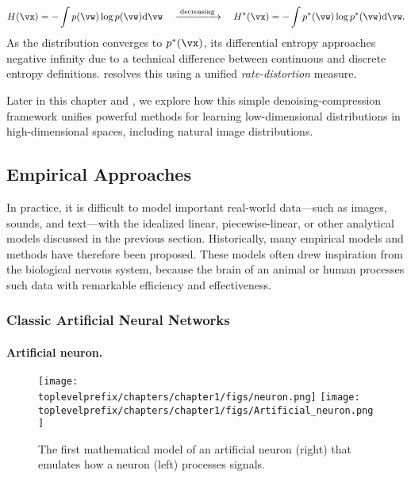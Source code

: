 \documentclass[../../book-main.tex]{subfiles}
\begin{document}
\begin{equation}
    H(\vx) = - \int p(\vw) \log p(\vw) \odif{\vw} \quad \xrightarrow{\hspace{1mm} \text{decreasing} \hspace{1mm}} \quad H^{*}(\vx) = - \int p^{*}(\vw) \log p^{*}(\vw) \odif{\vw}.
\end{equation}
As the distribution converges to \(p^{*}(\vx)\), its differential entropy approaches negative infinity due to a technical difference between continuous and discrete entropy definitions.  resolves this using a unified \textit{rate-distortion} measure.

Later in this chapter and , we explore how this simple denoising-compression framework unifies powerful methods for learning low-dimensional distributions in high-dimensional spaces, including natural image distributions.
\subsection{Empirical Approaches}
In practice, it is difficult to model important real-world data---such as images, sounds, and text---with the idealized linear, piecewise-linear, or other analytical models discussed in the previous section. Historically, many empirical models and methods have therefore been proposed. These models often drew inspiration from the biological nervous system, because the brain of an animal or human processes such data with remarkable efficiency and effectiveness.

\subsubsection{Classic Artificial Neural Networks}
\paragraph{Artificial neuron.}

\begin{figure}[t]
    \centering
    \texttt{[image: \\toplevelprefix/chapters/chapter1/figs/neuron.png]} \hspace{3mm}   
    \texttt{[image: \\toplevelprefix/chapters/chapter1/figs/Artificial\_neuron.png]}
    \caption{The first mathematical model of an artificial neuron (right) that emulates how a neuron (left) processes signals.}
    \label{fig:neuron}
\end{figure}
\end{document}
